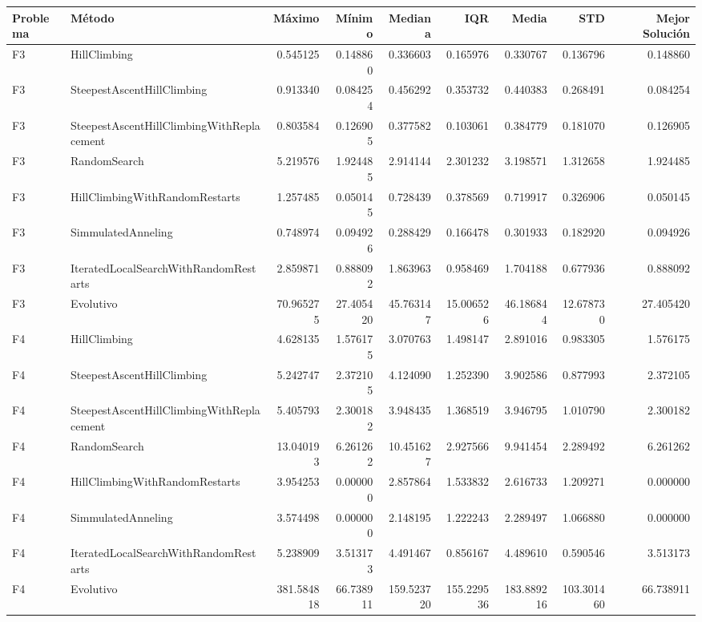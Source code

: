 \begin{tabular}{llrrrrrrr}
\toprule
Problema & Método & Máximo & Mínimo & Mediana & IQR & Media & STD & Mejor Solución \\
\midrule
F3 & HillClimbing & 0.545125 & 0.148860 & 0.336603 & 0.165976 & 0.330767 & 0.136796 & 0.148860 \\
F3 & SteepestAscentHillClimbing & 0.913340 & 0.084254 & 0.456292 & 0.353732 & 0.440383 & 0.268491 & 0.084254 \\
F3 & SteepestAscentHillClimbingWithReplacement & 0.803584 & 0.126905 & 0.377582 & 0.103061 & 0.384779 & 0.181070 & 0.126905 \\
F3 & RandomSearch & 5.219576 & 1.924485 & 2.914144 & 2.301232 & 3.198571 & 1.312658 & 1.924485 \\
F3 & HillClimbingWithRandomRestarts & 1.257485 & 0.050145 & 0.728439 & 0.378569 & 0.719917 & 0.326906 & 0.050145 \\
F3 & SimmulatedAnneling & 0.748974 & 0.094926 & 0.288429 & 0.166478 & 0.301933 & 0.182920 & 0.094926 \\
F3 & IteratedLocalSearchWithRandomRestarts & 2.859871 & 0.888092 & 1.863963 & 0.958469 & 1.704188 & 0.677936 & 0.888092 \\
F3 & Evolutivo & 70.965275 & 27.405420 & 45.763147 & 15.006526 & 46.186844 & 12.678730 & 27.405420 \\
F4 & HillClimbing & 4.628135 & 1.576175 & 3.070763 & 1.498147 & 2.891016 & 0.983305 & 1.576175 \\
F4 & SteepestAscentHillClimbing & 5.242747 & 2.372105 & 4.124090 & 1.252390 & 3.902586 & 0.877993 & 2.372105 \\
F4 & SteepestAscentHillClimbingWithReplacement & 5.405793 & 2.300182 & 3.948435 & 1.368519 & 3.946795 & 1.010790 & 2.300182 \\
F4 & RandomSearch & 13.040193 & 6.261262 & 10.451627 & 2.927566 & 9.941454 & 2.289492 & 6.261262 \\
F4 & HillClimbingWithRandomRestarts & 3.954253 & 0.000000 & 2.857864 & 1.533832 & 2.616733 & 1.209271 & 0.000000 \\
F4 & SimmulatedAnneling & 3.574498 & 0.000000 & 2.148195 & 1.222243 & 2.289497 & 1.066880 & 0.000000 \\
F4 & IteratedLocalSearchWithRandomRestarts & 5.238909 & 3.513173 & 4.491467 & 0.856167 & 4.489610 & 0.590546 & 3.513173 \\
F4 & Evolutivo & 381.584818 & 66.738911 & 159.523720 & 155.229536 & 183.889216 & 103.301460 & 66.738911 \\

\end{tabular}
